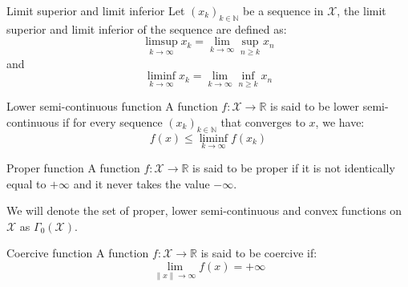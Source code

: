 \begin{definition}{Limit superior and limit inferior}
    Let $(x_k)_{k \in \mathbb{N}}$ be a sequence in $\mathcal{X}$, the limit superior and limit inferior of the sequence are defined as:
    \begin{equation}
        \limsup_{k \to \infty} x_k = \lim_{k \to \infty} \sup_{n \geq k} x_n
    \end{equation}
    and
    \begin{equation}
        \liminf_{k \to \infty} x_k = \lim_{k \to \infty} \inf_{n \geq k} x_n
    \end{equation}
    \label{def:limit_superior_inferior}
\end{definition}

\begin{definition}{Lower semi-continuous function}
    A function $f: \mathcal{X} \to \mathbb{R}$ is said to be lower semi-continuous if for every sequence $(x_k)_{k \in \mathbb{N}}$ that converges to $x$, we have:
    \begin{equation}
        f(x) \leq \liminf_{k \to \infty} f(x_k)
    \end{equation}
    \label{def:lower_semi_continuous}
\end{definition}

\begin{definition}{Proper function}
    A function $f: \mathcal{X} \to \mathbb{R}$ is said to be proper if it is not identically equal to $+\infty$ and it never takes the value $-\infty$.
    \label{def:proper_function}
\end{definition}

\begin{definition}
    We will denote the set of proper, lower semi-continuous and convex functions on $\mathcal{X}$ as $\Gamma_0(\mathcal{X})$.
\end{definition}

\begin{definition}{Coercive function}
    A function $f: \mathcal{X} \to \mathbb{R}$ is said to be coercive if:
    \begin{equation}
        \lim_{\|x\| \to \infty} f(x) = +\infty
    \end{equation}
    \label{def:coercive_function}
\end{definition}

